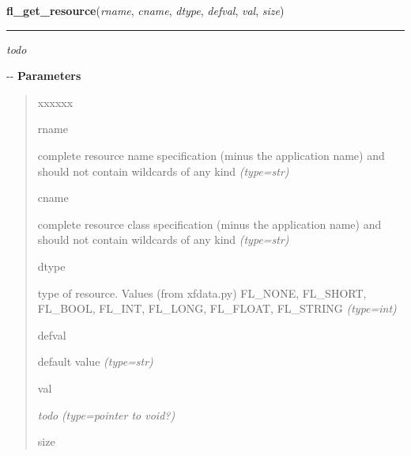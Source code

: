     \label{xformslib:flxbasic:fl_get_resource}

    \vspace{0.5ex}

\hspace{.8\funcindent}\begin{boxedminipage}{\funcwidth}

    \raggedright \textbf{fl\_get\_resource}(\textit{rname}, \textit{cname}, \textit{dtype}, \textit{defval}, \textit{val}, \textit{size})

    \vspace{-1.5ex}

    \rule{\textwidth}{0.5\fboxrule}
\setlength{\parskip}{2ex}

\emph{todo}

-{}-
\setlength{\parskip}{1ex}
      \textbf{Parameters}
      \vspace{-1ex}

      \begin{quote}
        \begin{Ventry}{xxxxxx}

          \item[rname]


complete resource name specification (minus the application name)
and should not contain wildcards of any kind
            {\it (type=str)}

          \item[cname]


complete resource class specification (minus the application name)
and should not contain wildcards of any kind
            {\it (type=str)}

          \item[dtype]


type of resource. Values (from xfdata.py) FL\_NONE, FL\_SHORT, FL\_BOOL,
FL\_INT, FL\_LONG, FL\_FLOAT, FL\_STRING
            {\it (type=int)}

          \item[defval]


default value
            {\it (type=str)}

          \item[val]


\emph{todo}
            {\it (type=pointer to void?)}

          \item[size]



\end{Ventry}
\end{quote}
\end{boxedminipage}

